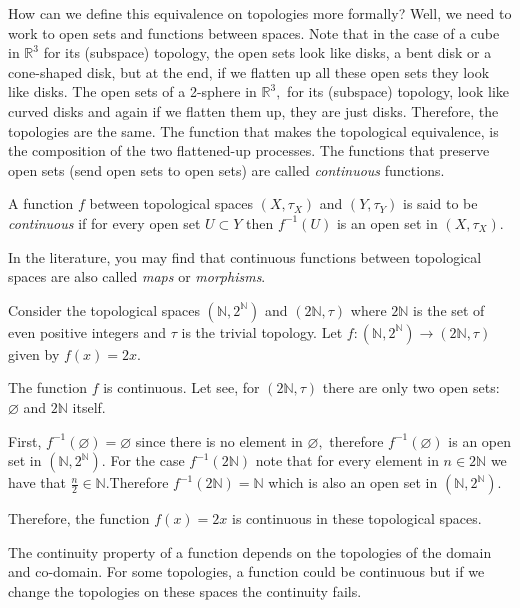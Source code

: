 \documentclass[
	fontsize=10pt, %
	twoside=false, %
	secnumdepth=1, %
]{kaobook}
\begin{document}
How can we define this equivalence on topologies more formally? Well, we need to work to open sets and functions between spaces. Note that in the case of a cube in $\mathbb{R}^3$ for its (subspace) topology, the open sets look like disks, a bent disk or a cone-shaped disk, but at the end, if we flatten up all these open sets they look like disks. The open sets of a 2-sphere in $\mathbb{R}^3,$ for its (subspace) topology, look like curved disks and again if we flatten them up, they are just disks. Therefore, the topologies are the same. The function that makes the topological equivalence, is the composition of the two flattened-up processes. The functions that preserve open sets (send open sets to open sets) are called \emph{continuous} functions. 

\begin{definition}
A function $f$ between topological spaces $(X,\tau_X)$ and $(Y,\tau_Y)$ is said to be \emph{continuous} if for every open set $U\subset Y$ then $f^{-1}(U)$ is an open set in $(X,\tau_X).$
\end{definition}

In the literature, you may find that continuous functions between topological spaces are also called \emph{maps} or \emph{morphisms}. 

\begin{example}
Consider the topological spaces $(\mathbb{N},2^{\mathbb{N}})$ and $(2\mathbb{N},\tau)$ where $2\mathbb{N}$ is the set of even positive integers and $\tau$ is the trivial topology. Let $f:(\mathbb{N},2^{\mathbb{N}})\to (2\mathbb{N},\tau)$ given by $f(x)=2x.$

The function $f$ is continuous. Let see, for $(2\mathbb{N},\tau)$ there are only two open sets: $\varnothing$ and $2\mathbb{N}$ itself. 

First, $f^{-1}(\varnothing)=\varnothing$ since there is no element in $\varnothing,$ therefore $f^{-1}(\varnothing)$ is an open set in $(\mathbb{N},2^{\mathbb{N}}).$ For the case $f^{-1}(2\mathbb{N})$ note that for every element in $n\in 2\mathbb{N}$ we have that $\frac{n}{2}\in\mathbb{N}$.Therefore $f^{-1}(2\mathbb{N})=\mathbb{N}$ which is also an open set in $(\mathbb{N},2^{\mathbb{N}}).$

Therefore, the function $f(x)=2x$ is continuous in these topological spaces.
\end{example}

The continuity property of a function depends on the topologies of the domain and co-domain. For some topologies, a function could be continuous but if we change the topologies on these spaces the continuity fails.
\end{document}

